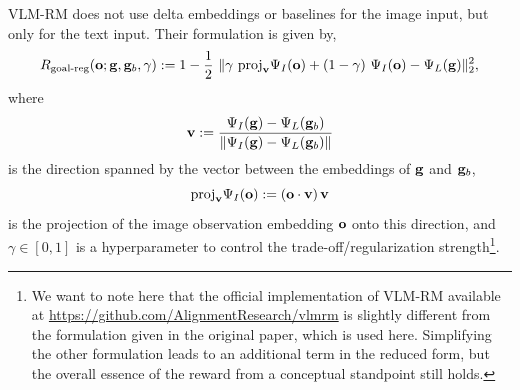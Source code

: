 VLM-RM does not use delta embeddings or baselines for the image input, but only for the text input.
Their formulation is given by,
\begin{equation}
    \label{eq:vlmrm}
    R_{\text{goal-reg}}(\bfo; \bfg, \bfg_b, \gamma) := 1 - \dfrac{1}{2}\ \norm{\gamma\ \text{proj}_{\bfv}\Psi_I(\bfo) + (1 - \gamma)\ \Psi_I(\bfo) - \Psi_L(\bfg)}^2_2,
\end{equation}
where \[\mathbf{v} := \frac{\Psi_I(\mathbf{g}) - \Psi_L(\mathbf{g}_b)}{\lVert\Psi_I(\mathbf{g}) - \Psi_L(\mathbf{g}_b)\rVert}\] is the direction spanned by the vector between the embeddings of \(\mathbf{g}\) and \(\mathbf{g}_b\), \[\text{proj}_{\mathbf{v}}\Psi_I(\mathbf{o}) := (\mathbf{o} \cdot \mathbf{v})\,\mathbf{v}\] is the projection of the image observation embedding \(\mathbf{o}\) onto this direction, and \(\gamma \in [0, 1]\) is a hyperparameter to control the trade-off/regularization strength\footnote{We want to note here that the official implementation of VLM-RM available at \url{https://github.com/AlignmentResearch/vlmrm} is slightly different from the formulation given in the original paper, which is used here. Simplifying the other formulation leads to an additional term in the reduced form, but the overall essence of the reward from a conceptual standpoint still holds.}.
% 
\vspace{-1.5pt}
